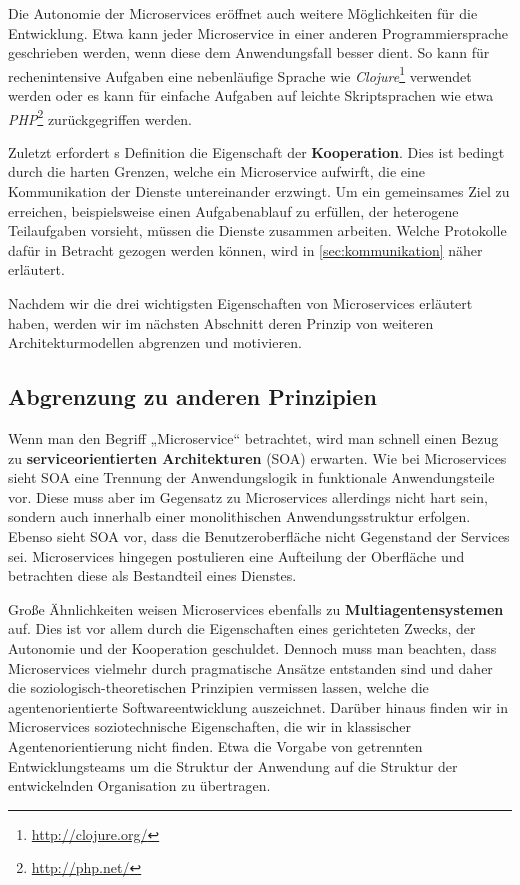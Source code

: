 Die Autonomie der Microservices eröffnet auch weitere Möglichkeiten für die Entwicklung. Etwa kann jeder Microservice in einer anderen Programmiersprache geschrieben werden, wenn diese dem Anwendungsfall besser dient. So kann für rechenintensive Aufgaben eine nebenläufige Sprache wie \textit{Clojure}\footnote{\url{http://clojure.org/}} verwendet werden oder es kann für einfache Aufgaben auf leichte Skriptsprachen wie etwa \textit{PHP}\footnote{\url{http://php.net/}} zurückgegriffen werden.

Zuletzt erfordert \citeauthor{newman2015}s Definition die Eigenschaft der \textbf{Kooperation}. Dies ist bedingt durch die harten Grenzen, welche ein Microservice aufwirft, die eine Kommunikation der Dienste untereinander erzwingt. Um ein gemeinsames Ziel zu erreichen, beispielsweise einen Aufgabenablauf zu erfüllen, der heterogene Teilaufgaben vorsieht, müssen die Dienste zusammen arbeiten. Welche Protokolle dafür in Betracht gezogen werden können, wird in \autoref{sec:kommunikation} näher erläutert.

Nachdem wir die drei wichtigsten Eigenschaften von Microservices erläutert haben, werden wir im nächsten Abschnitt deren Prinzip von weiteren Architekturmodellen abgrenzen und motivieren.

\subsection{Abgrenzung zu anderen Prinzipien}
\label{subsec:abgrenzung}

Wenn man den Begriff „Microservice“ betrachtet, wird man schnell einen Bezug zu \textbf{serviceorientierten Architekturen} (SOA) erwarten. Wie bei Microservices sieht SOA eine Trennung der Anwendungslogik in funktionale Anwendungsteile vor. Diese muss aber im Gegensatz zu Microservices allerdings nicht hart sein, sondern auch innerhalb einer monolithischen Anwendungsstruktur erfolgen. Ebenso sieht SOA vor, dass die Benutzeroberfläche nicht Gegenstand der Services sei. Microservices hingegen postulieren eine Aufteilung der Oberfläche und betrachten diese als Bestandteil eines Dienstes.

Große Ähnlichkeiten weisen Microservices ebenfalls zu \textbf{Multiagentensystemen} auf. Dies ist vor allem durch die Eigenschaften eines gerichteten Zwecks, der Autonomie und der Kooperation geschuldet. Dennoch muss man beachten, dass Microservices vielmehr durch pragmatische Ansätze entstanden sind und daher die soziologisch-theoretischen Prinzipien vermissen lassen, welche die agentenorientierte Softwareentwicklung auszeichnet. Darüber hinaus finden wir in Microservices soziotechnische Eigenschaften, die wir in klassischer Agentenorientierung nicht finden. Etwa die Vorgabe von getrennten Entwicklungsteams um die Struktur der Anwendung auf die Struktur der entwickelnden Organisation zu übertragen. 

